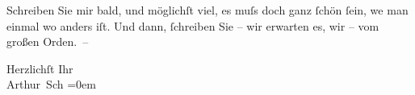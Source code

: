 \pstart
           Schreiben Sie mir bald, und möglichſt viel, es muſs doch ganz{ }ſchön{ }ſein, we{\geminationn} man einmal wo anders iſt. Und dann,{ }ſchreiben Sie –
               wir erwarten es, wir – vom großen Orden. –\pend
           
\pstart
           {\pb}Herzlichſt Ihr{\\[\baselineskip]}\spacefill\mbox{Arthur Sch}\pend
           \leftskip=0em{}\endnumbering{}  \newcommand{\dateiname}{L00079}\newcommand{\titel}{Arthur Schnitzler an Richard Beer-Hofmann, 11. 3. 1892}\newcommand{\editorInnen}{Herausgegeben von Martin Anton Müller}

